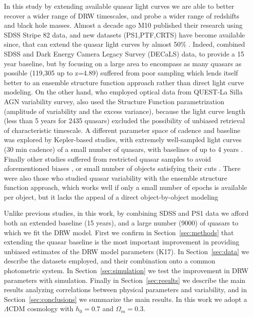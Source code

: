 \documentclass[twocolumn]{aastex62}
\begin{document}
In this study by extending available quasar light curves we are able to better recover a wider range of DRW timescales, and probe a wider range of redshifts and black hole masses. Almost a decade ago M10 published their research using SDSS Stripe 82 data, and new datasets (PS1,PTF,CRTS) have become available since, that can extend the quasar light curves by almost 50\% .  Indeed, \citet{li2018} combined SDSS and Dark Energy Camera Legacy Survey (DECaLS) data, to provide a 15 year baseline, but by focusing on a large area to encompass as many quasars as possible (119,305 up to z=4.89) suffered from poor sampling which lends itself better to an ensemble structure function approach rather than direct light curve modeling. On the other hand, \citet{sanchez2018} who employed optical data from QUEST-La Silla AGN variability survey, also used the Structure Function parametrization (amplitude of variability and the excess variance), because the light curve length (less than 5 years for 2435 quasars)  excluded the possibility of unbiased retrieval of characteristic timescale. A different parameter space of cadence and baseline was explored by Kepler-based studies, with extremely well-sampled light curves (30 min cadence) of a small number of quasars, with baselines of up to 4 years \citep{mushotzky2011, edelson2014, kasliwal2015a, kasliwal2017, smith2018, aranzana2018}. Finally other studies suffered from restricted quasar samples to avoid aforementioned biases \citep{guo2017, sun2018}, or small number of objects satisfying their cuts \citep{kelly2009,kelly2013,simm2016}.  There were also those who studied quasar variability with the ensemble structure function approach, which works well if only a small number of epochs is available per object, but it lacks the appeal of a direct object-by-object modeling \citep{bauer2009, macleod2012, caplar2017, kozlowski2016c}


 Unlike previous studies, in this work, by combining SDSS and PS1 data we afford both an extended baseline (15 years), and a large number (9000) of quasars to which we fit the DRW model. First we confirm in Section~\ref{sec:methods} that extending the quasar baseline is the most important improvement in providing unbiased estimates of the DRW model parameters (K17). In Section~\ref{sec:data} we describe the datasets employed, and their combination onto a common photometric system. In Section~\ref{sec:simulation} we test the improvement in DRW parameters with simulation. Finally in Section~\ref{sec:results} we describe the main results analyzing correlations between physical parameters and variability, and in Section~\ref{sec:conclusions} we summarize the main results. In this work we adopt a $\Lambda $CDM cosmology with $h_{0} = 0.7$ and $\Omega_{m} = 0.3 $. 
\end{document}
